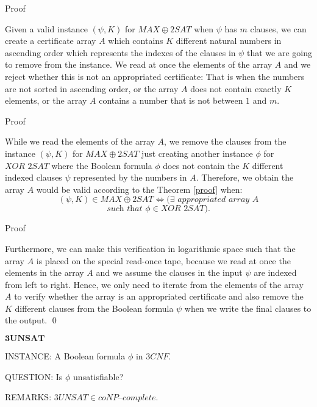 \documentclass[11pt]{beamer}
\begin{document}
\begin{frame}{Proof}

Given a valid instance $(\psi, K)$ for $MAX\oplus2SAT$ when $\psi$ has $m$ clauses, we can create a certificate array $A$ which contains $K$ different natural numbers in ascending order which represents the indexes of the clauses in $\psi$ that we are going to remove from the instance. We read at once the elements of the array $A$ and we reject whether this is not an appropriated certificate: That is when the numbers are not sorted in ascending order, or the array $A$ does not contain exactly $K$ elements, or the array $A$ contains a number that is not between $1$ and $m$.

\end{frame}

\begin{frame}{Proof}

While we read the elements of the array $A$, we remove the clauses from the instance $(\psi, K)$ for $MAX\oplus2SAT$ just creating another instance $\phi$ for $\textit{XOR 2SAT}$ where the Boolean formula $\phi$ does not contain the $K$ different indexed clauses $\psi$ represented by the numbers in $A$. Therefore, we obtain the array $A$ would be valid according to the Theorem \ref{proof} when:
\[(\psi, K) \in MAX\oplus2SAT \Leftrightarrow (\exists \textit{ appropriated array } A\]
\[\textit{such that } \phi \in \textit{XOR 2SAT}).\]

\end{frame}

\begin{frame}{Proof}

Furthermore, we can make this verification in logarithmic space such that the array $A$ is placed on the special read-once tape, because we read at once the elements in the array $A$ and we assume the clauses in the input $\psi$ are indexed from left to right. Hence, we only need to iterate from the elements of the array $A$ to verify whether the array is an appropriated certificate and also remove the $K$ different clauses from the Boolean formula $\psi$ when we write the final clauses to the output.  \qed

\end{frame}

\begin{frame}{$\textbf{3UNSAT}$}

\begin{definition}
INSTANCE: A Boolean formula $\phi$ in $3CNF$.

QUESTION: Is $\phi$ unsatisfiable?

REMARKS: $3UNSAT \in \textit{coNP--complete}$.
\end{definition}

\end{frame}
\end{document}

